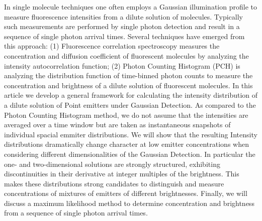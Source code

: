 \documentclass[%
 reprint,
 amsmath,amssymb,
 aps,
]{revtex4-1}
\begin{document}
In single molecule techniques one often employs a Gaussian illumination profile to measure fluorescence intensities from a dilute solution of molecules.  Typically such measurements are performed by single photon detection and result in a sequence of single photon arrival times.  Several techniques have emerged from this approach: (1) Fluorescence correlation spectroscopy measures the concentration and diffusion coefficient of fluorescent molecules by analyzing the intensity autocorrelation function; (2) Photon Counting Histogram (PCH) is analyzing the distribution function of time-binned photon counts to measure the concentration and brightness of a dilute solution of fluorescent molecules.  In this article we develop a general framework for calculating the intensity distribution of a dilute solution of Point emitters under Gaussian Detection.  As compared to the Photon Counting Histogram method, we do not assume that the intensities are averaged over a time window but are taken as instantaneous snapshots of individual spacial emmiter distributions.  We will show that the resulting Intensity distributions dramatically change character at low emitter concentrations when considering different dimensionalities of the Gaussian Detection.  In particular the one- and two-dimensional solutions are strongly structured, exhibiting discontinuities in their derivative at integer multiples of the brightness.  This makes these distributions strong candidates to distinguish and measure concentrations of mixtures of emitters of different brightnesses.  Finally, we will discuss a maximum likelihood method to determine concentration and brightness from a sequence of single photon arrival times. 
\end{document}
